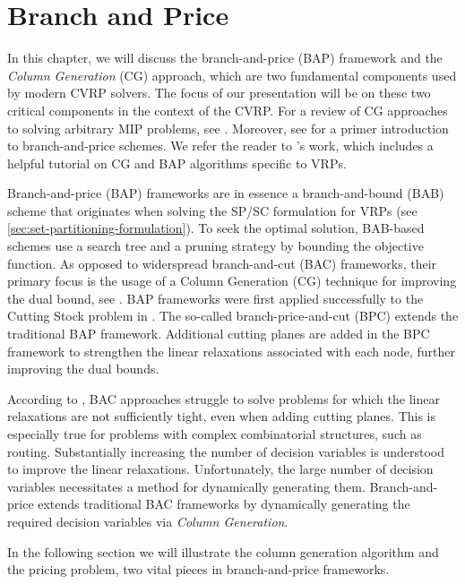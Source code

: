\chapter{Branch and Price}
\label{sec:branch-and-price}

In this chapter,
we will discuss the branch-and-price (BAP) framework and the \textit{Column Generation} (CG) approach,
which are two fundamental components used by modern CVRP solvers.
The focus of our presentation will be on these two critical components in the context of the CVRP.
For a review of CG approaches to solving arbitrary MIP problems, see \textcite{vanderbeck2005, lubbecke2005, desrosiers2011}.
Moreover, see \textcite{barnhart1998, desrosiers2005}
for a primer introduction to branch-and-price schemes.
We refer the reader to \textcite{feillet2010}'s work,
which includes a helpful tutorial on CG and BAP algorithms specific to VRPs.

Branch-and-price (BAP) frameworks are in essence a branch-and-bound (BAB) scheme \parencite{land2010}
that originates when solving the SP/SC formulation for VRPs (see \cref{sec:set-partitioning-formulation}).
To seek the optimal solution,
BAB-based schemes use a search tree and a pruning strategy by bounding the objective function.
As opposed to widerspread branch-and-cut (BAC) frameworks,
their primary focus is the usage of a Column Generation (CG) technique for improving the dual bound,
see \textcite{righini2008}.
BAP frameworks were first applied successfully to the Cutting Stock problem in \textcite{gilmore1961}.
The so-called branch-price-and-cut (BPC) extends the traditional BAP framework.
Additional cutting planes are added in the BPC framework to strengthen the linear relaxations
associated with each node, further improving the dual bounds.

According to \textcite{sadykov2019modern},
BAC approaches struggle to solve problems for which the linear relaxations
are not sufficiently tight, even when adding cutting planes.
This is especially true for problems with complex combinatorial structures, such as routing.
Substantially increasing the number of decision variables is understood to improve the linear relaxations.
Unfortunately, the large number of decision variables necessitates a method for dynamically generating them.
Branch-and-price extends traditional BAC frameworks by dynamically generating
the required decision variables via \textit{Column Generation}.

In the following section 
we will illustrate the column generation algorithm
and the pricing problem, two vital pieces in branch-and-price frameworks.

